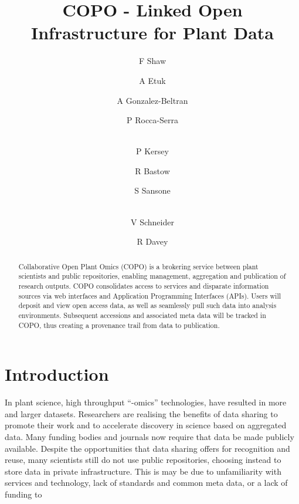 \documentclass[runningheads,a4paper]{llncs}
\begin{document}
\title{COPO - Linked Open Infrastructure for Plant Data}

\author{F Shaw  \and A Etuk  \and A Gonzalez-Beltran
  \and P Rocca-Serra \and\\
  P  Kersey \and R Bastow  \and S Sansone \and\\
  V Schneider \and R Davey }
%


\maketitle

\vspace*{-0.2in}
\begin{abstract}
Collaborative Open Plant Omics (COPO) is a brokering
  service between plant scientists and public repositories, enabling management, aggregation and publication of research
  outputs. COPO consolidates access to services and disparate
  information sources via web interfaces and Application Programming
  Interfaces (APIs). Users will deposit and view open
  access data, as well as seamlessly pull such data into analysis environments. Subsequent accessions and associated meta data will be tracked in COPO, thus creating a provenance trail from data to publication.
\end{abstract}

\vspace*{-0.3in}
\section{Introduction}

In plant science, high
throughput “-omics” technologies, have resulted in more and larger
datasets. Researchers are realising the benefits of data sharing to promote their work and to accelerate discovery in
science based on aggregated data. Many funding bodies and journals now
require that data be made publicly available. Despite the
opportunities that data sharing offers for recognition and reuse, many
scientists still do not use public repositories, choosing instead to store data in private infrastructure. This is may be due to unfamiliarity with services and technology, lack of standards and common meta data, or a lack of funding to
\end{document}

